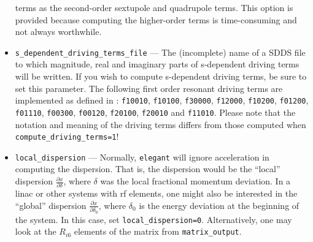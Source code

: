 \documentclass[11pt]{article}
\begin{document}
\begin{itemize}
  terms as the second-order sextupole and quadrupole terms. This option is provided because computing the higher-order terms is time-consuming and
  not always worthwhile.
\item \verb|s_dependent_driving_terms_file| --- The (incomplete) name of a SDDS file to which magnitude, real and imaginary parts of s-dependent driving terms will be written.
If you wish to compute s-dependent driving terms, be sure to set this parameter.
The following first order resonant driving terms are implemented as defined in \cite{sRDT}: {\tt f10010}, {\tt f10100}, 
{\tt f30000}, {\tt f12000}, {\tt f10200}, {\tt f01200}, {\tt f01110}, 
{\tt f00300}, {\tt f00120}, {\tt f20100}, {\tt f20010} and {\tt f11010}.
Please note that the notation and meaning of the driving terms differs from those computed when \verb|compute_driving_terms=1|!
\item \verb|local_dispersion| ---  Normally, {\tt elegant} will ignore acceleration in computing the
  dispersion.  That is, the dispersion would be the ``local'' dispersion $\frac{\partial x}{\partial \delta}$, where $\delta$
  was the local fractional momentum deviation.  In a linac or other systems with rf elements, one might also be interested in the ``global'' dispersion
  $\frac{\partial x}{\partial \delta_0}$, where $\delta_0$ is the energy deviation at the beginning of the system.
  In this case, set \verb|local_dispersion=0|.  Alternatively, one may look at the $R_{i6}$ elements of the matrix from 
  \verb|matrix_output|.
\end{itemize}
\end{document}
